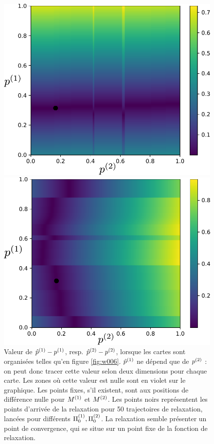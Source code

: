 \documentclass[../main]{subfiles}
\begin{document}
\begin{figure}
\begin{minipage}{0.5\textwidth}
\centering
\includegraphics[width=\textwidth]{champ_X_006_notraj.pdf}
\end{minipage}
\begin{minipage}{0.5\textwidth}
\centering
\includegraphics[width=\textwidth]{champ_Y_006_notraj.pdf}
\end{minipage}
\caption{Valeur de ${\hat{p}}^{({1})} - p^{({1})}$, resp. ${\hat{p}}^{({2})} - p^{({2})}$, lorsque les cartes sont organisées telles qu'en figure \ref{fig:w006}. ${\hat{p}}^{({1})}$ ne dépend que de $p^{({2})}$ : on peut donc tracer cette valeur selon deux dimensions pour chaque carte. Les zones où cette valeur est nulle sont en violet sur le graphique. Les points fixes, s'il existent, sont aux positions de différence nulle pour $M^{({1})}$ et $M^{({2})}$. Les points noirs représentent les points d'arrivée de la relaxation pour 50 trajectoires de relaxation, lancées pour différents $\Pi_0^{({1})}, \Pi_0^{({2})}$. La relaxation semble présenter un point de convergence, qui se situe sur un point fixe de la fonction de relaxation.}
\label{fig:diff_relax_notraj}
\end{figure}
\end{document}
